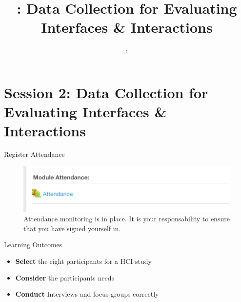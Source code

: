 \setlength{\parindent}{0pt}
\setlength{\parskip}{6pt plus 2pt minus 1pt}
\setlength{\emergencystretch}{3em}  %
\providecommand{\tightlist}{%
  \setlength{\itemsep}{0pt}\setlength{\parskip}{0pt}}
\setcounter{secnumdepth}{0}

\usetikzlibrary{arrows,automata}

\providecommand{\tightlist}{%
  \setlength{\itemsep}{0pt}\setlength{\parskip}{0pt}}




\title{\sessionnumber: Data Collection for Evaluating Interfaces \& Interactions}
\subtitle{\modulecode: \moduletitle}

\frame{\titlepage} 



\section{Session 2: Data Collection for Evaluating Interfaces \&
Interactions}\label{session-2-data-collection-for-evaluating-interfaces-interactions}

\begin{frame}{Register Attendance}

\begin{figure}
\centering
\includegraphics{assets/attendance.png}
\caption{Attendance monitoring is in place. It is your responsability to
ensure that you have signed yourself in.}
\end{figure}

\end{frame}

\begin{frame}{Learning Outcomes}

\begin{itemize}
\tightlist
\item
  \textbf{Select} the right participants for a HCI study
\item
  \textbf{Consider} the participants needs
\item
  \textbf{Conduct} Interviews and focus groups correctly
\end{itemize}

\end{frame}

